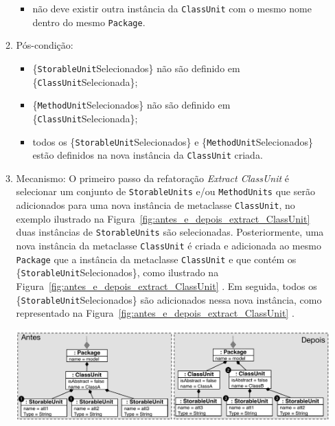 \begin{enumerate}
\begin{enumerate}
\begin{itemize}
			        \item não deve existir outra instância da \texttt{ClassUnit} com o mesmo nome dentro do mesmo \texttt{Package}.
			    \end{itemize}
			\item Pós-condição:
			    \begin{itemize}
			        \item \{\texttt{StorableUnit}Selecionados\} não são definido em \{\texttt{ClassUnit}Selecionada\};
			        \item \{\texttt{MethodUnit}Selecionados\} não são definido em \{\texttt{ClassUnit}Selecionada\};
			        \item todos os \{\texttt{StorableUnit}Selecionados\} e \{\texttt{MethodUnit}Selecionados\} estão definidos na nova instância da \texttt{ClassUnit} criada.
			    \end{itemize}
			\item Mecanismo: O primeiro passo da refatoração \textit{Extract ClassUnit} é selecionar um conjunto de \texttt{StorableUnits} e/ou \texttt{MethodUnits} que serão adicionados para uma nova instância de metaclasse \texttt{ClassUnit}, no exemplo ilustrado na Figura~\ref{fig:antes_e_depois_extract_ClassUnit}  duas instâncias de \texttt{StorableUnits} são selecionadas. Posteriormente, uma nova instância da metaclasse \texttt{ClassUnit} é criada e adicionada ao mesmo \texttt{Package} que a instância da metaclasse \texttt{ClassUnit} e que contém os \{\texttt{StorableUnit}Selecionados\}, como ilustrado na Figura~\ref{fig:antes_e_depois_extract_ClassUnit} . Em seguida, todos os \{\texttt{StorableUnit}Selecionados\} são adicionados nessa nova instância, como representado na Figura~\ref{fig:antes_e_depois_extract_ClassUnit} . %
\begin{minipage}{.90\textwidth}
	\vspace*{\fill}
  \centering
	\includegraphics[scale=0.6]{images/extractClassUnitAntesEDepois2}

\end{minipage}
\end{enumerate}
\end{enumerate}
